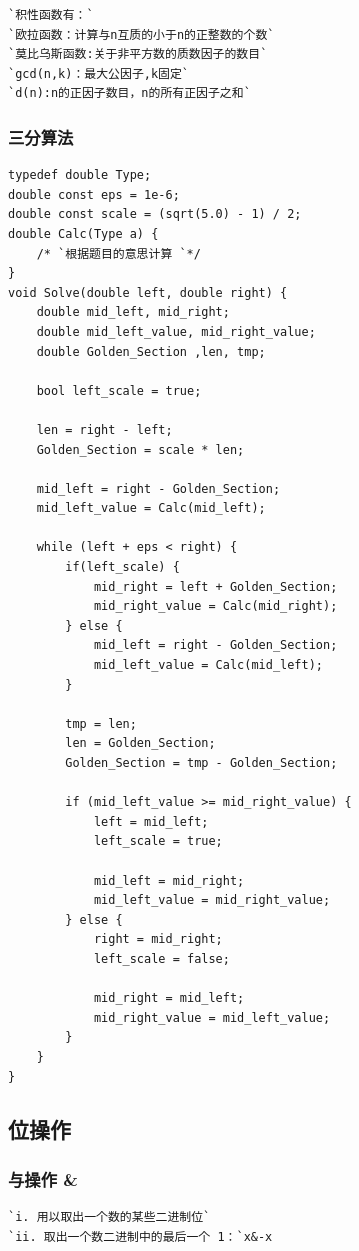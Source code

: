 \documentclass[a4paper]{article}
\begin{document}
\begin{CJK*}{UTF8}{gbsn}
\begin{multicols}{3}
\begin{flushleft}
\begin{lstlisting}
`积性函数有：`
`欧拉函数：计算与n互质的小于n的正整数的个数`
`莫比乌斯函数:关于非平方数的质数因子的数目`
`gcd(n,k)：最大公因子,k固定`
`d(n):n的正因子数目，n的所有正因子之和`
\end{lstlisting}

\subsubsection{三分算法}
\begin{lstlisting}
typedef double Type;
double const eps = 1e-6;
double const scale = (sqrt(5.0) - 1) / 2;
double Calc(Type a) {
    /* `根据题目的意思计算 `*/
}
void Solve(double left, double right) {
    double mid_left, mid_right;
    double mid_left_value, mid_right_value;
    double Golden_Section ,len, tmp;

    bool left_scale = true;

    len = right - left;
    Golden_Section = scale * len;

    mid_left = right - Golden_Section;
    mid_left_value = Calc(mid_left);

    while (left + eps < right) {
        if(left_scale) {
            mid_right = left + Golden_Section;
            mid_right_value = Calc(mid_right);
        } else {
            mid_left = right - Golden_Section;
            mid_left_value = Calc(mid_left);
        }

        tmp = len;
        len = Golden_Section;
        Golden_Section = tmp - Golden_Section;

        if (mid_left_value >= mid_right_value) {
            left = mid_left;
            left_scale = true;

            mid_left = mid_right;
            mid_left_value = mid_right_value;
        } else {
            right = mid_right;
            left_scale = false;

            mid_right = mid_left;
            mid_right_value = mid_left_value;
        }
    }
}
\end{lstlisting}

\subsection{位操作}

\subsubsection{与操作 \&}
\begin{lstlisting}
`i. 用以取出一个数的某些二进制位`
`ii. 取出一个数二进制中的最后一个 1：`x&-x
\end{lstlisting}


\end{flushleft}
\end{multicols}
\end{CJK*}
\end{document}
